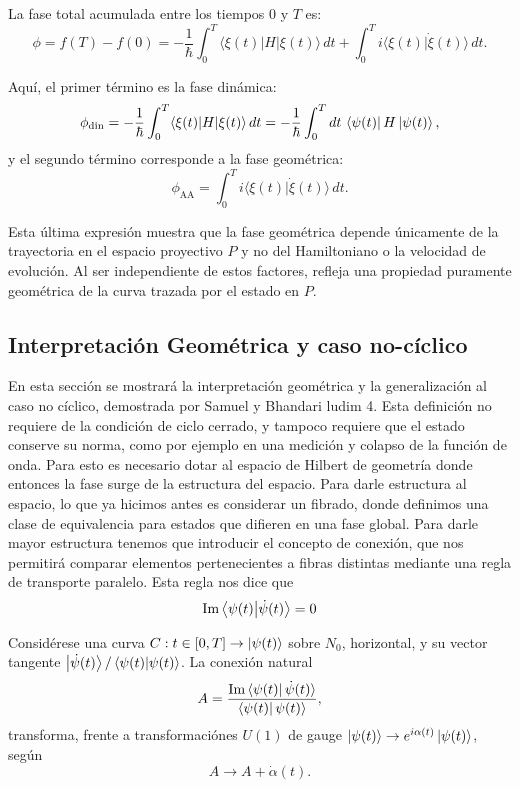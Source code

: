 La fase total acumulada entre los tiempos \( 0 \) y \( T \) es:
\[
\phi = f(T) - f(0) = -\frac{1}{\hbar} \int_0^T \langle \xi(t) | H | \xi(t) \rangle \, dt + \int_0^T i \langle \xi(t) | \dot{\xi}(t) \rangle \, dt.
\]

Aquí, el primer término es la fase dinámica:
\[
\phi_{\text{din}} = -\frac{1}{\hbar} \int_0^T \langle \xi(t) | H | \xi(t) \rangle \, dt = -\frac{1}{\hbar}\int_0^T dt \, \bra{\psi(t)}H\ket{\psi(t)},
\]
y el segundo término corresponde a la fase geométrica:
\begin{equation} \label{eq:fg AA}
    \phi_{\text{AA}} = \int_0^T i \langle \xi(t) | \dot{\xi}(t) \rangle \, dt.
\end{equation}

Esta última expresión muestra que la fase geométrica depende únicamente de la trayectoria en el espacio proyectivo \( P \) y no del Hamiltoniano o la velocidad de evolución. Al ser independiente de estos factores, refleja una propiedad puramente geométrica de la curva trazada por el estado en \( P \).



\subsection{Interpretación Geométrica y caso no-cíclico}
En esta sección se mostrará la interpretación geométrica y la generalización al caso no cíclico, demostrada por Samuel y Bhandari \cite{}ludim 4. Esta definición no requiere de la condición de ciclo cerrado, y tampoco requiere que el estado conserve su norma, como por ejemplo en una medición y colapso de la función de onda. Para esto es necesario dotar al espacio de Hilbert de geometría donde entonces la fase surge de la estructura del espacio. \newline
Para darle estructura al espacio, lo que ya hicimos antes es considerar un fibrado, donde definimos una clase de equivalencia para estados que difieren en una fase global. Para darle mayor estructura tenemos que introducir el concepto de conexión, que nos permitirá comparar elementos pertenecientes a fibras distintas mediante una regla de transporte paralelo. Esta regla nos dice que
\begin{equation} \label{eq2:transporte paralelo}
    \text{Im} \braket{\psi(t)}{\dot \psi(t)}=0
\end{equation}

Considérese una curva \( C: t \in [0, T] \to \ket{\psi(t)} \) sobre \( N_0 \), horizontal, y su vector tangente $\ket{\dot{\psi}(t)}/\braket{\psi(t)}{\psi(t)}$. La conexión natural
\begin{equation}
A = \frac{\text{Im} \bra{\psi(t)} \dot{\psi}(t) \rangle}{\bra{\psi(t)} \psi(t) \rangle},
\end{equation}
transforma, frente a transformaciónes \( U(1) \) de gauge \( \ket{\psi(t)} \to e^{i\alpha(t)} \ket{\psi(t)} \), según
\begin{equation} \label{eq2:transformación de gauge}
A \to A + \dot{\alpha}(t).
\end{equation}

